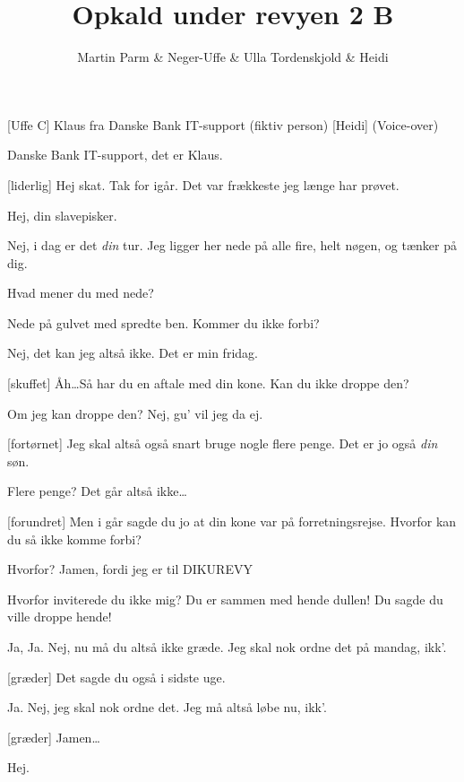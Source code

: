 \documentclass[a4paper]{article}
\title{Opkald under revyen 2 B}
\author{Martin Parm \& Neger-Uffe \& Ulla Tordenskjold \& Heidi}
\begin{document}
\maketitle

\begin{roles}
  [Uffe C] Klaus fra Danske Bank IT-support (fiktiv person)
  [Heidi] (Voice-over)
\end{roles}

\begin{sketch}

 Danske Bank IT-support, det er Klaus.

[liderlig] Hej skat. Tak for igår. Det var frækkeste jeg længe har
prøvet.

 Hej, din slavepisker.

 Nej, i dag er det \emph{din} tur. Jeg ligger her nede på alle fire,
helt nøgen, og tænker på dig.

 Hvad mener du med nede?

 Nede på gulvet med spredte ben. Kommer du ikke forbi?

 Nej, det kan jeg altså ikke. Det er min fridag.

[skuffet] Åh\ldots Så har du en aftale med din kone. Kan du ikke
droppe den?

 Om jeg kan droppe den? Nej, gu' vil jeg da ej.

[fortørnet] Jeg skal altså også snart bruge nogle flere penge. Det er
jo også \emph{din} søn.

 Flere penge? Det går altså ikke\ldots

[forundret] Men i går sagde du jo at din kone var på forretningsrejse.
Hvorfor kan du så ikke komme forbi? 

 Hvorfor? Jamen, fordi jeg er til DIKUREVY

 Hvorfor inviterede du ikke mig?  Du er sammen med hende
dullen!  Du sagde du ville droppe hende!

 Ja, Ja. Nej, nu må du altså ikke græde. Jeg skal nok ordne det på
mandag, ikk'.

[græder] Det sagde du også i sidste uge.

 Ja. Nej, jeg skal nok ordne det. Jeg må altså løbe nu, ikk'.

[græder] Jamen\ldots

 Hej.

\end{sketch}
\end{document}
